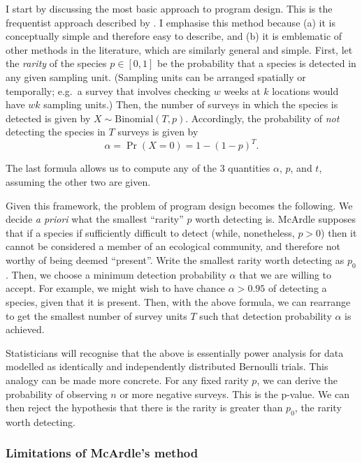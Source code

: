 \documentclass[
]{book}
\begin{document}
I start by discussing the most basic approach to program design. This is the frequentist approach described by \citet{mcardle1990}. I emphasise this method because (a) it is conceptually simple and therefore easy to describe, and (b) it is emblematic of other methods in the literature, which are similarly general and simple. First, let the \emph{rarity} of the species \(p \in [0, 1]\) be the probability that a species is detected in any given sampling unit. (Sampling units can be arranged spatially or temporally; e.g.~a survey that involves checking \(w\) weeks at \(k\) locations would have \(wk\) sampling units.) Then, the number of surveys in which the species is detected is given by \(X \sim \mathrm{Binomial}(T, p)\). Accordingly, the probability of \emph{not} detecting the species in \(T\) surveys is given by
\[
\alpha = \Pr(X = 0) = 1 - (1 - p)^T.
\]

The last formula allows us to compute any of the 3 quantities \(\alpha\), \(p\), and \(t\), assuming the other two are given.

Given this framework, the problem of program design becomes the following. We decide \emph{a priori} what the smallest ``rarity'' \(p\) worth detecting is. McArdle supposes that if a species if sufficiently difficult to detect (while, nonetheless, \(p > 0\)) then it cannot be considered a member of an ecological community, and therefore not worthy of being deemed ``present''. Write the smallest rarity worth detecting as \(p_0\). Then, we choose a minimum detection probability \(\alpha\) that we are willing to accept. For example, we might wish to have chance \(\alpha > 0.95\) of detecting a species, given that it is present. Then, with the above formula, we can rearrange to get the smallest number of survey units \(T\) such that detection probability \(\alpha\) is achieved.

Statisticians will recognise that the above is essentially power analysis for data modelled as identically and independently distributed Bernoulli trials. This analogy can be made more concrete. For any fixed rarity \(p\), we can derive the probability of observing \(n\) or more negative surveys. This is the p-value. We can then reject the hypothesis that there is the rarity is greater than \(p_0\), the rarity worth detecting.

\hypertarget{limitations-of-mcardles-method}{%
\subsubsection{Limitations of McArdle's method}\label{limitations-of-mcardles-method}}
\end{document}
